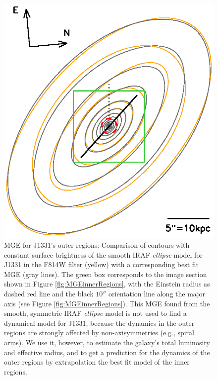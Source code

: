 \begin{figure}
\centering
\includegraphics[width=0.8\columnwidth]{fig/1331F814W_MGE_disk_L.ps}
\caption{MGE for J1331's outer regions: Comparison of contours with constant surface brightness of the smooth IRAF \emph{ellipse} model for J1331 in the F814W filter (yellow) with a corresponding best fit MGE (gray lines). The green box corresponds to the image section shown in Figure \ref{fig:MGEinnerRegions}, with the Einstein radius as dashed red line and the black $10''$ orientation line along the major axis (see Figure \ref{fig:MGEinnerRegions}). This MGE found from the smooth, symmetric IRAF \emph{ellipse} model is not used to find a dynamical model for J1331, because the dynamics in the outer regions are strongly affected by non-axisymmetries (e.g., spiral arms). We use it, however, to estimate the galaxy's total luminosity and effective radius, and to get a prediction for the dynamics of the outer regions by extrapolation the best fit model of the inner regions. }
\label{fig:MGEouterRegions}
\end{figure}

